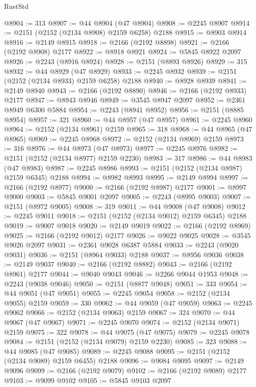\begin{lexlean}{RustStd}
\begin{coremodule}
@8904 := 313
@8907 := @44 @8904 (@47 @8904)
@8908 := @2245 @8907
@8914 := @2151 (@2152 (@2134 @8908) @2159 @6258) @2188
@8915 := @8903 @8914
@8916 := @2149 @8915
@8918 := @2166 (@2192 @8898)
@8921 := @2166 (@2192 @8908) @2177
@8922 := @8918 @8921
@8924 := @5845 @8922 @2097
@8926 := @2243 (@8916 @8924)
@8928 := @2151 (@8893 @8926)
@8929 := 315
@8932 := @44 @8929 (@47 @8929)
@8933 := @2245 @8932
@8939 := @2151 (@2152 (@2134 @8933) @2159 @6258) @2188
@8940 := @8928 @8939
@8941 := @2149 @8940
@8943 := @2166 (@2192 @8890)
@8946 := @2166 (@2192 @8933) @2177
@8947 := @8943 @8946
@8949 := @3545 @8947 @2097
@8952 := @2361 @8949 @6300 @5884
@8954 := @2243 (@8941 @8952)
@8956 := @2151 (@8885 @8954)
@8957 := 321
@8960 := @44 @8957 (@47 @8957)
@8961 := @2245 @8960
@8964 := @2152 (@2134 @8961) @2159
@8965 := 318
@8968 := @44 @8965 (@47 @8965)
@8969 := @2245 @8968
@8972 := @2152 (@2134 @8969) @2159
@8973 := 316
@8976 := @44 @8973 (@47 @8973)
@8977 := @2245 @8976
@8982 := @2151 (@2152 (@2134 @8977) @2159 @2230)
@8983 := 317
@8986 := @44 @8983 (@47 @8983)
@8987 := @2245 @8986
@8993 := @2151 (@2152 (@2134 @8987) @2159 @6345) @2188
@8994 := @8982 @8993
@8995 := @2149 @8994
@8997 := @2166 (@2192 @8977)
@9000 := @2166 (@2192 @8987) @2177
@9001 := @8997 @9000
@9003 := @5845 @9001 @2097
@9005 := @2243 (@8995 @9003)
@9007 := @2151 (@8972 @9005)
@9008 := 319
@9011 := @44 @9008 (@47 @9008)
@9012 := @2245 @9011
@9018 := @2151 (@2152 (@2134 @9012) @2159 @6345) @2188
@9019 := @9007 @9018
@9020 := @2149 @9019
@9022 := @2166 (@2192 @8969)
@9025 := @2166 (@2192 @9012) @2177
@9026 := @9022 @9025
@9028 := @3545 @9026 @2097
@9031 := @2361 @9028 @6387 @5884
@9033 := @2243 (@9020 @9031)
@9036 := @2151 (@8964 @9033) @2188
@9037 := @8956 @9036
@9038 := @2149 @9037
@9040 := @2166 (@2192 @8882)
@9043 := @2166 (@2192 @8961) @2177
@9044 := @9040 @9043
@9046 := @2266 @9044 @1953
@9048 := @2243 (@9038 @9046)
@9050 := @2151 (@8877 @9048)
@9051 := 333
@9054 := @44 @9051 (@47 @9051)
@9055 := @2245 @9054
@9058 := @2152 (@2134 @9055) @2159
@9059 := 330
@9062 := @44 @9059 (@47 @9059)
@9063 := @2245 @9062
@9066 := @2152 (@2134 @9063) @2159
@9067 := 324
@9070 := @44 @9067 (@47 @9067)
@9071 := @2245 @9070
@9074 := @2152 (@2134 @9071) @2159
@9075 := 322
@9078 := @44 @9075 (@47 @9075)
@9079 := @2245 @9078
@9084 := @2151 (@2152 (@2134 @9079) @2159 @2230)
@9085 := 323
@9088 := @44 @9085 (@47 @9085)
@9089 := @2245 @9088
@9095 := @2151 (@2152 (@2134 @9089) @2159 @6455) @2188
@9096 := @9084 @9095
@9097 := @2149 @9096
@9099 := @2166 (@2192 @9079)
@9102 := @2166 (@2192 @9089) @2177
@9103 := @9099 @9102
@9105 := @5845 @9103 @2097

\end{coremodule}
\end{lexlean}
